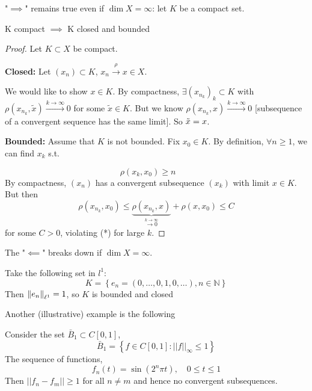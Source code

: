 \documentclass{article}
\begin{document}
\begin{remark}
    "$\implies$" remains true even if $\dim X = \infty$: let $K$ be a compact set.
\end{remark}

\begin{proposition}
    K compact $\implies$ K closed and bounded
\end{proposition}
\begin{proof}
Let $K\subset X$ be compact.  

\textbf{Closed:}\nextline  
Let $(x_n) \subset K$, $x_n \overset{\rho}{\longrightarrow} x \in X$.  

We would like to show $x \in K$. By compactness, $\exists (x_{n_k})_k \subset K$ with $\rho(x_{n_k}, \tilde{x}) \overset{k\to \infty}{\longrightarrow} 0$ for some $\tilde{x} \in K$. But we know $\rho(x_{n_k}, x)\overset{k\to \infty}{\longrightarrow} 0$ [subsequence of a convergent sequence has the same limit]. So $\Tilde{x}=x$. 

\textbf{Bounded:}\nextline
Assume that $K$ is not bounded. Fix $x_0 \in K$. By definition, $\forall n \geq 1$, we can find $x_k$ s.t. 

$$
\rho(x_k, x_0) \geq n \qquad
$$  
By compactness, $(x_n)$ has a convergent subsequence $(x_k)$ with limit $x \in K$. But then 
$$
\rho(x_{n_k}, x_0) \leq \underbrace{\rho(x_{n_k}, x)}_{\overset{k \to \infty}{\longrightarrow 0}} + \rho(x, x_0) \leq C
$$
for some $C>0$, violating (*) for large $k$.
\end{proof}

The "$\impliedby$" breaks down if $\dim X = \infty$.

\begin{example}
    Take the following set in $l^1$:  
    \begin{equation*}
        K = \left\{ e_n = (0, \ldots, 0, 1, 0, \ldots), n \in \mathbb{N} \right\}
    \end{equation*}  
    Then $\left\|{e_n}\right\|_{\ell^1}=1$, so $K$ is bounded and closed
\end{example}  

Another (illustrative) example is the following  

\begin{example}
    Consider the set $\bar{B}_1 \subset C[0,1]$,  
    \begin{equation*}
        \bar{B}_1 = \left\{ f \in C[0,1] : ||f||_{\infty} \leq 1 \right\}
    \end{equation*}  
    The sequence of functions,  
    \begin{equation*}
        f_n(t) = \sin(2^n \pi t), \quad 0 \leq t \leq 1
    \end{equation*}  
    Then $||f_n-f_m||\geq 1$ for all $n \neq m$ and hence no convergent subsequences. 
\end{example}
\end{document}
